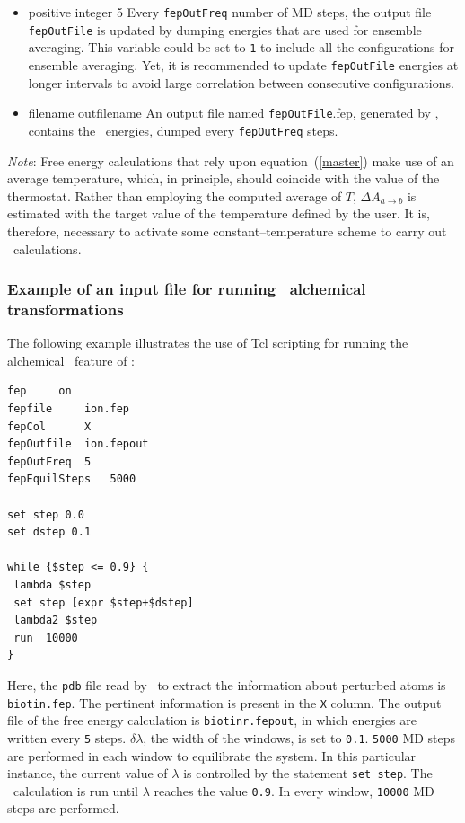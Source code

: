 \begin{itemize}
\item
{}
{positive integer}
{5}
{Every {\tt fepOutFreq} number of MD steps, the output file
{\tt fepOutFile} is updated by dumping energies that are
used for ensemble averaging.
This variable could be set to {\tt 1} to include all the 
configurations for ensemble averaging. Yet, it is recommended
to update {\tt fepOutFile}  energies at longer intervals
to avoid large correlation between consecutive configurations.}

\item
{}
{filename}
{outfilename}
{An output file named {\tt fepOutFile}.fep, generated by \NAMD,
contains the \FEP\ energies, dumped every {\tt fepOutFreq} steps.}

\end{itemize}


\noindent
{\it Note}: Free energy calculations that rely upon equation~({\ref{master}})
make use of an average temperature, which, in principle, should coincide with
the value of the thermostat. Rather than employing the computed average of $T$,
$\Delta A_{a \rightarrow b}$ is estimated with the target value of the
temperature defined by the user. It is, therefore, necessary to activate
some constant--temperature scheme to carry out \FEP\ calculations. 



\subsubsection{Example of an input file for running \FEP\ alchemical transformations}


The following example illustrates the use of {\sc Tcl} scripting for running
the alchemical \FEP\ feature of \NAMD: 

\begin{verbatim}
fep		on  
fepfile		ion.fep
fepCol		X
fepOutfile	ion.fepout
fepOutFreq	5
fepEquilSteps	5000

set step 0.0
set dstep 0.1

while {$step <= 0.9} {
 lambda $step
 set step [expr $step+$dstep]
 lambda2 $step
 run  10000
}
\end{verbatim}

\noindent
Here, the {\tt pdb} file read by \NAMD\ to extract the information
about perturbed atoms is {\tt biotin.fep}. The pertinent information 
is present in the {\tt X} column. The output file of the free energy
calculation is {\tt biotinr.fepout}, in which energies are written
every {\tt 5} steps.
$\delta \lambda$, the width of the windows, is set to {\tt 0.1}.
{\tt 5000} MD steps are performed in each window to
equilibrate the system. In this particular instance, 
the current value of $\lambda$
is controlled by the statement {\tt set step}. 
The \FEP\ calculation is run until $\lambda$ reaches the
value {\tt 0.9}. In every window, {\tt 10000} MD steps
are performed.


